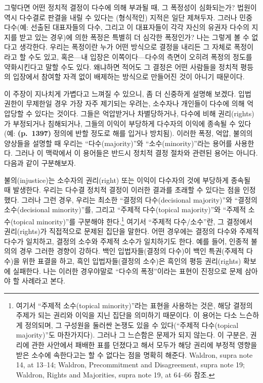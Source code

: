 \documentclass[a4paper,12pt,oneside]{article}  %
\begin{document}
그렇다면 어떤 정치적 결정이 다수에 의해 부과될 때, 그 폭정성이
심화되는가? 법원이 역시 다수결로 판결을 내릴 수 있다는 (형식적인) 지적은
일단 제쳐두자. 그러나 민중 다수(예: 선출된 대표자들의 다수, 그리고 이
대표자들이 각각 자신의 유권자 다수의 지지를 받고 있는 경우)에 의한
폭정은 특별히 더 심각한 폭정인가? 나는 그렇게 볼 수 없다고 생각한다.
우리는 폭정이란 누가 어떤 방식으로 결정을 내리든 그 자체로 폭정이라고 할
수도 있고, 혹은---내 입장은 이쪽이다---다수의 측면이 오히려 폭정의
정도를 약화시킨다고 말할 수도 있다. 왜냐하면 적어도 그 결정은 어떤
사람들을 정치적 평등의 입장에서 참여할 자격 없이 배제하는 방식으로
만들어진 것이 아니기 때문이다.

이 주장이 지나치게 가볍다고 느껴질 수 있으니, 좀 더 신중하게 설명해
보겠다. 입법 권한이 무제한일 경우 가장 자주 제기되는 우려는, 소수자나
개인들이 다수에 의해 억압당할 수 있다는 것이다. 그들은 억압받거나
차별당하거나, 다수에 비해 권리(rights)가 부정되거나 침해되거나, 그들의
이익이 부당하게 다수자의 이익에 종속될 수 있다(예: \textbf{(p.~1397)}
정의에 반할 정도로 해를 입거나 방치됨). 이러한 폭정, 억압, 불의의
양상들을 설명할 때 우리는 ``다수(majority)''와 ``소수(minority)''라는
용어를 사용한다. 그러나 이 맥락에서 이 용어들은 반드시 정치적 결정
절차와 관련된 용어는 아니다. 다음과 같이 구분해보자.

불의(injustice)는 소수자의 권리(right) 또는 이익이 다수자의 것에
부당하게 종속될 때 발생한다. 우리는 다수결 정치적 결정이 이러한 결과를
초래할 수 있다는 점을 인정했다. 그러나 그런 경우, 우리는 최소한 ``결정의
다수(decisional majority)''와 ``결정의 소수(decisional minority)''를,
그리고 ``주제적 다수(topical majority)''와 ``주제적 소수(topical
minority)''를 구분해야 한다.\footnote{여기서 ``주제적 소수(topical
  minority)''라는 표현을 사용하는 것은, 해당 결정의 주제가 되는 권리와
  이익을 지닌 집단을 의미하기 때문이다. 이 용어는 다소 느슨하게
  정의되며, 그 구성원을 둘러싼 논쟁도 있을 수 있다(``주제적 다수(topical
  majority)''도 마찬가지다). 그러나 그 느슨함은 문제가 되지 않는다. 이
  구분은, 권리에 관한 사안에서 패배한 표를 던졌다고 해서 모두가 해당
  권리에 부정적 영향을 받은 소수에 속한다고는 할 수 없다는 점을 명확히
  해준다. Waldron, supra note 14, at 13--14; Waldron, Precommitment and
  Disagreement, supra note 19; Waldron, Rights and Majorities, supra
  note 19, at 64--66 참조.} 여기서 ``주제적 다수/소수''란, 그 결정에서
권리(rights)가 직접적으로 문제된 집단을 말한다. 어떤 경우에는 결정의
다수와 주제적 다수가 일치하고, 결정의 소수와 주제적 소수가 일치하기도
한다. 예를 들어, 인종적 불의의 경우 그러한 경향이 강하다. 백인
입법자들(결정의 다수)이 백인 특권(주제적 다수)을 위한 표결을 하고, 흑인
입법자들(결정의 소수)은 흑인의 평등 권리(rights) 확보에 실패한다. 나는
이러한 경우야말로 ``다수의 폭정''이라는 표현이 진정으로 문제 삼아야 할
사례라고 본다.
\end{document}

